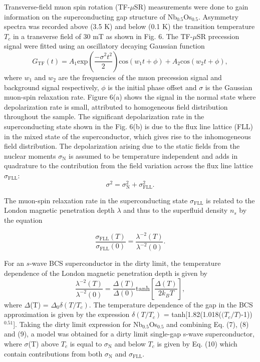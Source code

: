 \documentclass[reprint, superscriptaddress, secnumarabic, amssymb, nobibnotes, aps, prl]{revtex4-1}
\begin{document}
Transverse-field muon spin rotation (TF-$\mu$SR) measurements were done to gain information on the superconducting gap structure of Nb$_{0.5}$Os$_{0.5}$. Asymmetry spectra was recorded above (3.5 K) and below (0.1 K) the transition temperature $T_{c}$ in a transverse field of 30 mT as shown in Fig. 6. The TF-$\mu$SR precession signal were fitted using an oscillatory decaying Gaussian function
\begin{equation}
G_{\mathrm{TF}}(t) = A_{1}\mathrm{exp}\left(\frac{-\sigma^{2}t^{2}}{2}\right)\mathrm{cos}(w_{1}t+\phi)+A_{2}\mathrm{cos}(w_{2}t+\phi) ,
\label{eqn6:Tranf}
\end{equation}
where $w_{1}$ and $w_{2}$ are the frequencies of the muon precession signal and background signal respectively, $\phi$ is the initial phase offset and $\sigma$ is the Gaussian muon-spin relaxation rate. Figure 6(a) shows the signal in the normal state where depolarization rate is small, attributed to homogeneous field distribution throughout the sample. The significant depolarization rate in the superconducting state shown in the Fig. 6(b) is due to the flux line lattice (FLL) in the mixed state of the superconductor, which gives rise to the inhomogeneous field distribution. The depolarization arising due to the static fields from the nuclear moments $\sigma_{\mathrm{N}}$ is assumed to be temperature independent and adds in quadrature to the contribution from the field variation across the flux line lattice $\sigma_{\mathrm{FLL}}$:
\begin{equation}
\sigma^{2} = \sigma_{\mathrm{N}}^{2}+\sigma_{\mathrm{FLL}}^{2} .
\label{eqn7:sigma}
\end{equation}

The muon-spin relaxation rate in the superconducting state $\sigma_{\mathrm{FLL}}$ is related to the London magnetic penetration depth $\lambda$ and thus to the superfluid density $n_{s}$ by the equation 

\begin{equation}
\frac{\sigma_{\mathrm{FLL}}(T)}{\sigma_{\mathrm{FLL}}(0)} = \frac{\lambda^{-2}(T)}{\lambda^{-2}(0)} .
\label{eqn8:sfd}
\end{equation}

For an $\textit{s}$-wave BCS superconductor in the dirty limit, the temperature dependence of the London magnetic penetration depth is given by 
\begin{equation}
\frac{\lambda^{-2}(T)}{\lambda^{-2}(0)} = \frac{\Delta(T)}{\Delta(0)}\mathrm{tanh}\left[\frac{\Delta(T)}{2k_{B}T}\right] ,
\label{eqn9:lpd}
\end{equation}
 where $\Delta$(T) = $\Delta_{0}$$\delta(T/T_{c})$. The temperature dependence of the gap in the BCS approximation is given by the expression $\delta(T/T_{c})$ = tanh[1.82(1.018($\mathit{(T_{c}/T})$-1))$^{0.51}$]. Taking the dirty limit expression for Nb$_{0.5}$Os$_{0.5}$ and  combining Eq. (7), (8) and (9), a model was obtained for a dirty limit single-gap s-wave superconductor, where $\sigma$(T) above ${T}_{c}$ is equal to $\sigma_{\mathrm{N}}$ and below ${T}_{c}$ is given by Eq. (10) which contain contributions from both $\sigma_{\mathrm{N}}$ and $\sigma_{\mathrm{FLL}}$. 
\end{document}
